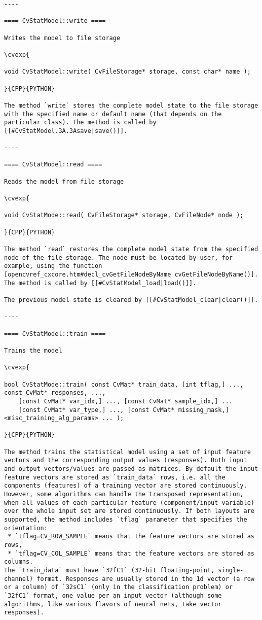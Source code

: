 \begin{verbatim}
----

==== CvStatModel::write ====

Writes the model to file storage

\cvexp{

void CvStatModel::write( CvFileStorage* storage, const char* name );

}{CPP}{PYTHON}

The method `write` stores the complete model state to the file storage with the specified name or default name (that depends on the particular class). The method is called by [[#CvStatModel.3A.3Asave|save()]].

----

==== CvStatModel::read ====

Reads the model from file storage

\cvexp{

void CvStatMode::read( CvFileStorage* storage, CvFileNode* node );

}{CPP}{PYTHON}

The method `read` restores the complete model state from the specified node of the file storage. The node must be located by user, for example, using the function [opencvref_cxcore.htm#decl_cvGetFileNodeByName cvGetFileNodeByName()]. The method is called by [[#CvStatModel_load|load()]].

The previous model state is cleared by [[#CvStatModel_clear|clear()]].

----

==== CvStatModel::train ====

Trains the model

\cvexp{

bool CvStatMode::train( const CvMat* train_data, [int tflag,] ..., const CvMat* responses, ...,
    [const CvMat* var_idx,] ..., [const CvMat* sample_idx,] ...
    [const CvMat* var_type,] ..., [const CvMat* missing_mask,] <misc_training_alg_params> ... );

}{CPP}{PYTHON}

The method trains the statistical model using a set of input feature vectors and the corresponding output values (responses). Both input and output vectors/values are passed as matrices. By default the input feature vectors are stored as `train_data` rows, i.e. all the components (features) of a training vector are stored continuously. However, some algorithms can handle the transposed representation, when all values of each particular feature (component/input variable) over the whole input set are stored continuously. If both layouts are supported, the method includes `tflag` parameter that specifies the orientation:
 * `tflag=CV_ROW_SAMPLE` means that the feature vectors are stored as rows,
 * `tflag=CV_COL_SAMPLE` means that the feature vectors are stored as columns.
The `train_data` must have `32fC1` (32-bit floating-point, single-channel) format. Responses are usually stored in the 1d vector (a row or a column) of `32sC1` (only in the classification problem) or `32fC1` format, one value per an input vector (although some algorithms, like various flavors of neural nets, take vector responses).


\end{verbatim}
